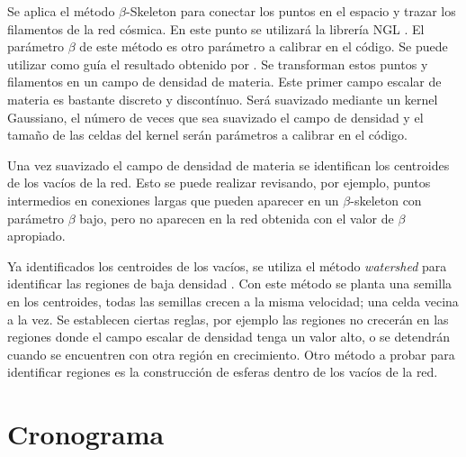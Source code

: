 \documentclass[preprint]{aastex62}
\begin{document}
  Se aplica el método $\beta$-Skeleton para conectar los puntos en el espacio y trazar los
  filamentos de la red cósmica. En este punto se utilizará la librería NGL \citep{ngl}.
  El parámetro $\beta$ de este método es otro parámetro a calibrar en el código. Se puede
  utilizar como guía el resultado obtenido por \citet{Fang2018}.
  Se transforman estos puntos y filamentos en un campo de densidad de materia. Este primer
  campo escalar de materia es bastante discreto y discontínuo. Será suavizado mediante un
  kernel Gaussiano, el número de veces que sea suavizado el campo de densidad y el tamaño de
  las celdas del kernel serán parámetros a calibrar en el código.

  Una vez suavizado el campo de densidad de materia se identifican los centroides
  de los vacíos de la red. Esto se puede realizar revisando, por ejemplo, puntos intermedios
  en conexiones largas que pueden aparecer en un $\beta$-skeleton con parámetro $\beta$ bajo,
  pero no aparecen en la red obtenida con el valor de $\beta$ apropiado.

  Ya identificados los centroides de los vacíos, se utiliza el método \textit{watershed}
  para identificar las regiones de baja densidad \citep{Sutter2015}. Con este método
  se planta una semilla en los centroides, todas las semillas crecen a la misma velocidad; una
  celda vecina a la vez. Se establecen ciertas reglas, por ejemplo las regiones no crecerán en
  las regiones donde el campo escalar de densidad tenga un valor alto, o se detendrán cuando
  se encuentren con otra región en crecimiento. Otro método a probar para identificar regiones
  es la construcción de esferas dentro de los vacíos de la red. 

  \section{Cronograma}
\end{document}
